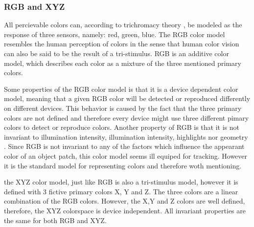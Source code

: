 \documentclass[a4paper,11pt]{article}
\begin{document}
\subsubsection{RGB and XYZ}
		
All percievable colors can, according to trichromacy theory \cite{gevers_color}, be modeled as the response of three sensors, namely: red, green, blue. The RGB color model resembles the human perception of colors in the sense that human color vision can also be said to be the result of a tri-stimulus.  RGB is an additive color model, which describes each color as a mixture of the three mentioned primary colors.

Some properties of the RGB color model is that it is a device dependent color model, meaning that a given RGB color will be detected or reproduced differently on different devices. This behavior is caused by the fact that the three primary colors are not defined and therefore every device might use three different pimary colors to detect or reproduce colors. Another property of RGB is that it is not invariant to illumination intensity, illumination intensity, highlights nor geometry \cite{gevers_invariant}. Since RGB is not invariant to any of the factors which influence the appearant color of an object patch, this color model seems ill equiped for tracking. However it is the standard model for representing colors and therefore woth mentioning.

the XYZ color model, just like RGB is also a tri-stimulus model, however it is defined  with 3 fictive primary colors X, Y and Z. The three colors are a linear combination of the RGB colors. However, the X,Y and Z colors are well defined, therefore, the XYZ colorspace is device independent. All invariant properties are the same for both RGB and XYZ.

		
\end{document}
